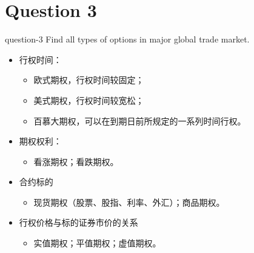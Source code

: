 \section{Question 3}
\begin{statebox}{}{question-3}
    Find all types of options in major global trade market.
\end{statebox}
\begin{itemize}
    \item 行权时间：
        \begin{itemize}
            \item 欧式期权，行权时间较固定；
            \item 美式期权，行权时间较宽松；
            \item 百慕大期权，可以在到期日前所规定的一系列时间行权。
        \end{itemize}
    \item 期权权利：
        \begin{itemize}
            \item 看涨期权；看跌期权。
        \end{itemize}
    \item 合约标的
        \begin{itemize}
            \item 现货期权（股票、股指、利率、外汇）；商品期权。
        \end{itemize}
    \item 行权价格与标的证券市价的关系
        \begin{itemize}
            \item 实值期权；平值期权；虚值期权。
        \end{itemize}
\end{itemize}



% 

